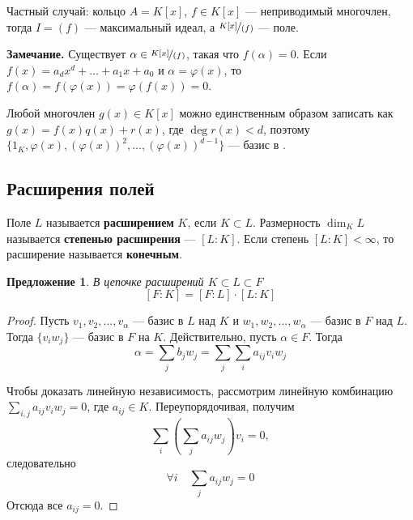 \documentclass[a4paper]{article}
\let\temp\phi
\let\phi\varphi
\let\varphi\temp
\numberwithin{theorem}{section}
\numberwithin{lemma}{section}
\newtheorem{proposition}{Предложение}
\numberwithin{proposition}{section}
\numberwithin{corollary}{section}
\begin{document}
\begin{minipage}{0.7\linewidth}
Частный случай: кольцо $A = K[x]$, $f \in K[x]$ --- неприводимый многочлен, тогда $I = (f)$ --- максимальный идеал,
а $\nicefrac{K[x]}{(f)}$ --- поле.
\end{minipage}
\begin{minipage}{0.15\linewidth}
\end{minipage}

\textbf{Замечание.}
Существует $\alpha \in \nicefrac{K[x]}{(f)}$, такая что $f(\alpha) = 0$. Если $f(x) = a_d x^d + \ldots + a_1 x + a_0 $ и $\alpha = \phi(x)$,
то $f(\alpha) = f(\phi(x)) = \phi(f(x)) = 0$.

Любой многочлен $g(x) \in K[x]$ можно единственным образом записать как $g(x) = f(x)q(x) + r(x)$, где $\deg r(x) < d$, поэтому
$\{1_K, \phi(x), (\phi(x))^2, \ldots, (\phi(x))^{d-1}\}$ --- базис в
.

\subsection*{Расширения полей}
Поле $L$ называется \textbf{расширением} $K$, если $K \subset L$.
Размерность $\dim_K L$ называется \textbf{степенью расширения} --- $[L : K]$.
Если степень $[L : K] < \infty$, то расширение называется \textbf{конечным}.

\begin{proposition} В цепочке расширений $K \subset L \subset F$
\[[F:K] = [F:L] \cdot [L : K]\]
\end{proposition}
\begin{proof}
Пусть $v_1, v_2, \ldots, v_\alpha$ --- базис в $L$ над $K$ и
$w_1, w_2, \ldots, w_\alpha$ --- базис в $F$ над $L$.
Тогда $\{v_i w_j\}$ --- базис в $F$ на $K$.
Действительно, пусть $\alpha \in F$. Тогда
\[\alpha = \sum_j b_j w_j = \sum_j \sum_i a_{ij}v_i w_j \]

Чтобы доказать линейную независимость, рассмотрим
линейную комбинацию $\sum_{i,j} a_{ij}v_i w_j = 0$, где $a_{ij} \in K$.
Переупорядочивая, получим \[\sum_i\left(\sum_j a_{ij} w_j\right)v_i = 0,\]
следовательно \[\forall i \quad \sum_j a_{ij} w_j = 0\]
Отсюда все $a_{ij} = 0$.
\end{proof}
\end{document}

